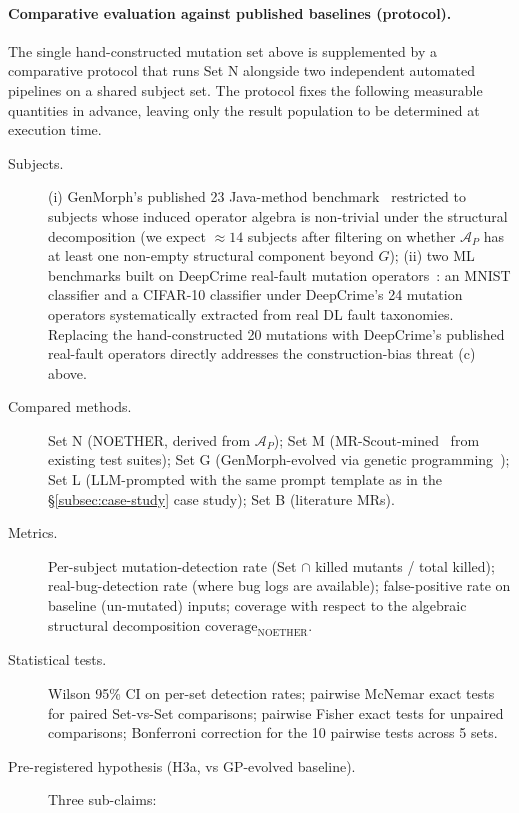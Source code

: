 \documentclass[acmsmall,screen,review]{acmart}
\begin{document}
\paragraph{Comparative evaluation against published baselines (protocol).}
\label{para:comp-eval-protocol}
The single hand-constructed mutation set above is supplemented by a comparative protocol that runs Set N alongside two independent automated pipelines on a shared subject set. The protocol fixes the following measurable quantities in advance, leaving only the result population to be determined at execution time.

\begin{description}
  \item[Subjects.] (i) GenMorph's published 23 Java-method benchmark~\cite{GenMorph2024} restricted to subjects whose induced operator algebra is non-trivial under the structural decomposition (we expect $\approx 14$ subjects after filtering on whether $\mathcal{A}_P$ has at least one non-empty structural component beyond $G$); (ii) two ML benchmarks built on DeepCrime real-fault mutation operators~\cite{Humbatova2021DeepCrime}: an MNIST classifier and a CIFAR-10 classifier under DeepCrime's 24 mutation operators systematically extracted from real DL fault taxonomies. Replacing the hand-constructed 20 mutations with DeepCrime's published real-fault operators directly addresses the construction-bias threat (c) above.
  \item[Compared methods.] Set N (NOETHER, derived from $\mathcal{A}_P$); Set M (MR-Scout-mined~\cite{MRScout2024} from existing test suites); Set G (GenMorph-evolved via genetic programming~\cite{GenMorph2024}); Set L (LLM-prompted with the same prompt template as in the §\ref{subsec:case-study} case study); Set B (literature MRs).
  \item[Metrics.] Per-subject mutation-detection rate (Set $\cap$ killed mutants / total killed); real-bug-detection rate (where bug logs are available); false-positive rate on baseline (un-mutated) inputs; coverage with respect to the algebraic structural decomposition $\mathrm{coverage}_{\mathrm{NOETHER}}$.
  \item[Statistical tests.] Wilson 95\% CI on per-set detection rates; pairwise McNemar exact tests for paired Set-vs-Set comparisons; pairwise Fisher exact tests for unpaired comparisons; Bonferroni correction for the 10 pairwise tests across 5 sets.
  \item[Pre-registered hypothesis (H3a, vs GP-evolved baseline).]
  Three sub-claims:
  \begin{description}

\end{description}
\end{description}
\end{document}
